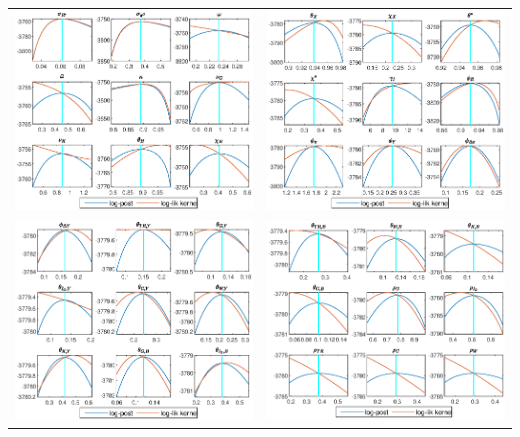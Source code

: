 \documentclass[a4paper,11pt]{article}
\numberwithin{equation}{section}
\begin{document}
\begin{minipage}{\linewidth}
{\begin{tabular}{p{9cm} p{9cm}}
			\includegraphics[width=9cm, trim =0 0 0.97cm 0]{SAFiscal_CheckPlots3.eps} & \includegraphics[width=9cm, trim =0.97cm 0 0 0]{SAFiscal_CheckPlots4.eps}\\
			\includegraphics[width=9cm, trim =0 0 0.97cm 0]{SAFiscal_CheckPlots5.eps} & \includegraphics[width=9cm, trim =0.97cm 0 0 0]{SAFiscal_CheckPlots6.eps}\\

\end{tabular}}
\end{minipage}
\end{document}
